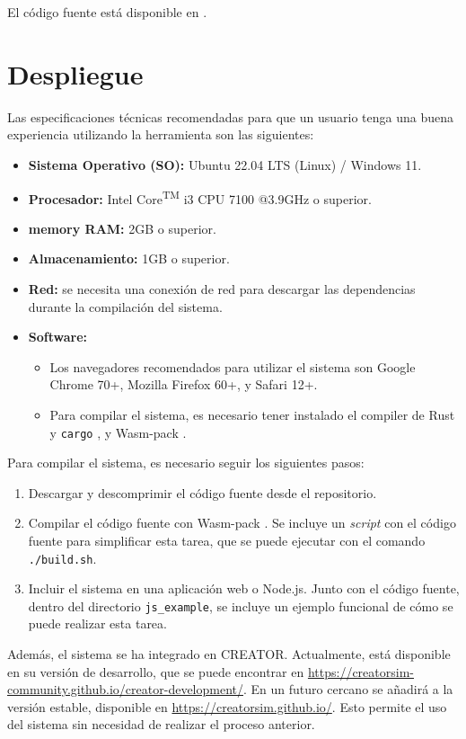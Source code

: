 \let\componentref\undefined

\noindent
El código fuente está disponible en \myrepo.

\FloatBarrier

\section{Despliegue}\label{sec:deployment}

\noindent
Las especificaciones técnicas recomendadas para que un usuario tenga una buena
experiencia utilizando la herramienta son las siguientes:

\begin{itemize}
    \item \textbf{Sistema Operativo (SO):} Ubuntu 22.04 LTS (Linux) / Windows 11.
    \item \textbf{Procesador:} Intel\textsuperscript{\textregistered} Core\textsuperscript{TM} i3 CPU 7100 @3.9GHz o superior.
    \item \textbf{\Gls{memory} RAM:} 2GB o superior.
    \item \textbf{Almacenamiento:} 1GB o superior.
    \item \textbf{Red:} se necesita una conexión de red para descargar las
    dependencias durante la compilación del sistema.
    \item \textbf{Software:}
    \begin{itemize}
        \item Los navegadores recomendados para utilizar el sistema son Google
        Chrome 70+, Mozilla Firefox 60+, y Safari 12+.
        \item Para compilar el sistema, es necesario tener instalado el
        \gls{compiler} de Rust y \verb!cargo! \parencite{rust-toolchain}, y Wasm-pack
        \parencite{Wasm-pack}.
    \end{itemize}
\end{itemize}

\noindent
Para compilar el sistema, es necesario seguir los siguientes pasos:

\begin{enumerate}
    \item Descargar y descomprimir el código fuente desde el repositorio.
    \item Compilar el código fuente con Wasm-pack \parencite{Wasm-pack}. Se
    incluye un \textit{script} con el código fuente para simplificar esta tarea,
    que se puede ejecutar con el comando \verb!./build.sh!.
    \item Incluir el sistema en una aplicación web o Node.js. Junto con el
    código fuente, dentro del directorio \verb!js_example!, se incluye un
    ejemplo funcional de cómo se puede realizar esta tarea.
\end{enumerate}

Además, el sistema se ha integrado en CREATOR. Actualmente, está disponible en
su versión de desarrollo, que se puede encontrar en
\url{https://creatorsim-community.github.io/creator-development/}. En un futuro
cercano se añadirá a la versión estable, disponible en
\url{https://creatorsim.github.io/}. Esto permite el uso del sistema sin
necesidad de realizar el proceso anterior.
